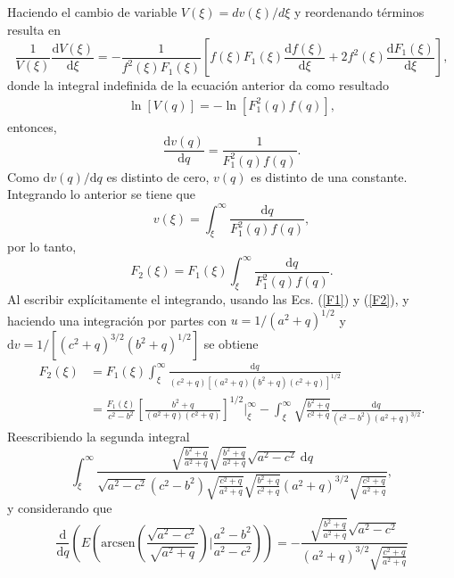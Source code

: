 Haciendo el cambio de variable $V(\xi)=dv(\xi)/d\xi$ y reordenando términos resulta en
\begin{equation*}
    \frac{1}{V(\xi)}\frac{\text{d}V(\xi)}{\text{d}\xi}=-\frac{1}{f^2(\xi)F_1(\xi)}\left[f(\xi)F_1(\xi)\frac{\text{d}f(\xi)}{\text{d}\xi}+2f^2(\xi)\frac{\text{d}F_1(\xi)}{\text{d}\xi}\right],
\end{equation*}
donde la integral indefinida de la ecuación anterior da como resultado
\begin{align*}
    \ln[V(q)]=-\ln[F_1^2(q)f(q)],
\end{align*}
entonces,
\begin{equation*}
    \frac{\text{d}v(q)}{\text{d}q}=\frac{1}{F_1^2(q)f(q)}.
\end{equation*}
Como $\text{d}v(q)/\text{d}q$ es distinto de cero,  $v(q)$ es distinto de una constante. Integrando lo anterior se tiene que
\begin{equation*}
    v(\xi)=\int_{\xi}^{\infty}\frac{\text{d}q}{F_1^2(q)f(q)},
\end{equation*}
por lo tanto, 
\begin{equation}
  F_2(\xi)=F_1(\xi)\int_{\xi}^{\infty}\frac{\text{d}q}{F_1^2(q)f(q)}.
  \label{F2}
\end{equation}
Al escribir explícitamente el integrando, usando las Ecs. (\ref{F1}) y (\ref{F2}), y haciendo una integración por partes con $u=1/(a^2+q)^{1/2}$ y $\text{d}v=1/[(c^2+q)^{3/2}(b^2+q)^{1/2}]$ se obtiene
\begin{align}
    F_2(\xi)&=F_1(\xi)\int_{\xi}^{\infty}\frac{\text{d}q}{(c^2+q)[(a^2+q)(b^2+q)(c^2+q)]^{1/2}}\nonumber\\
    &=\frac{F_1(\xi)}{c^2-b^2}\left[\frac{b^2+q}{(a^2+q)(c^2+q)}\right]^{1/2}\Bigg|_\xi^{\infty}-\int_\xi^{\infty}\sqrt{\frac{b^2+q}{c^2+q}}\frac{\text{d}q}{(c^2-b^2)(a^2+q)^{3/2}}.
\end{align}
Reescribiendo la segunda integral
\begin{equation}
	\int_\xi^{\infty}\frac{\sqrt{\frac{b^2+q}{a^2+q}}\sqrt{\frac{b^2+q}{a^2+q}}\sqrt{a^2-c^2}\:\text{d}q}{\sqrt{a^2-c^2}(c^2-b^2)\sqrt{\frac{c^2+q}{a^2+q}}\sqrt{\frac{b^2+q}{c^2+q}}(a^2+q)^{3/2}\sqrt{\frac{c^2+q}{a^2+q}}},\label{eliptic}
\end{equation}
y considerando que
\begin{equation*}
	\frac{\text{d}}{\text{d}q}\left(E\left(\mbox{arcsen}\left(\frac{\sqrt{a^2-c^2}}{\sqrt{a^2+q}}\right)\Bigg|\frac{a^2-b^2}{a^2-c^2}\right)\right)=-\frac{\sqrt{\frac{b^2+q}{a^2+q}}\sqrt{a^2-c^2}}{(a^2+q)^{3/2}\sqrt{\frac{c^2+q}{a^2+q}}}
\end{equation*}
